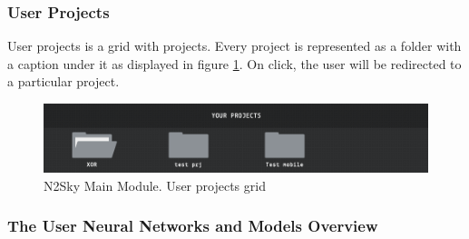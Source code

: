 \subsubsection{User Projects}

User projects is a grid with projects. Every project is represented as a folder with a caption under it as displayed in figure \ref{fig:n2sky_dashboard_projects}. On click, the user will be redirected to a particular project. 

\begin{figure}[H]
\begin{center}
  \includegraphics[scale=0.5]{components/5/img/n2sky_dashboard_projects.png}
  \caption{N2Sky Main Module. User projects grid}
  \label{fig:n2sky_dashboard_projects}
\end{center}
\end{figure}

 \subsubsection{The User Neural Networks and Models Overview}
 

